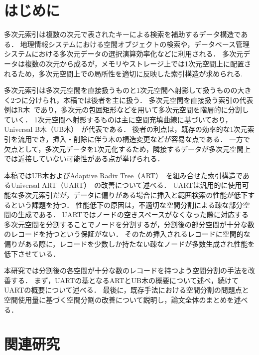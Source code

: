 
\chapter{はじめに}

多次元索引は複数の次元で表されたキーによる検索を補助するデータ構造である．
地理情報システムにおける空間オブジェクトの検索や，データベース管理システムにおける多次元データの選択演算効率化などに利用される．
多次元データは複数の次元から成るが，メモリやストレージ上では1次元空間上に配置されるため，多次元空間上での局所性を適切に反映した索引構造が求められる.

多次元索引は多次元空間を直接扱うものと1次元空間へ射影して扱うものの大きく2つに分けられ，本稿では後者を主に扱う．
多次元空間を直接扱う索引の代表例はR木~\cite{sigmod:Beckmann1990}であり，多次元の包囲矩形などを用いて多次元空間を階層的に分割していく．
1次元空間へ射影するものは主に空間充填曲線に基づいており，Universal B木（UB木）~\cite{wwca:Bayer1997}が代表である．
後者の利点は，既存の効率的な1次元索引を流用でき，挿入・削除に伴う木の構造変更などが容易な点である．
一方で欠点として，多次元データを1次元化するため，隣接するデータが多次元空間上では近接していない可能性がある点が挙げられる．

本稿ではUB木およびAdaptive Radix Tree（ART）~\cite{icde:Leis2013}を組み合せた索引構造であるUniversal ART（UART）~\cite{deim:Suzuki2023}の改善について述べる．
UARTは汎用的に使用可能な多次元索引だが，データに偏りがある場合に挿入と範囲検索の性能が低下するという課題を持つ．
性能低下の原因は，不適切な空間分割による疎な部分空間の生成である．
UARTではノードの空きスペースがなくなった際に対応する多次元空間を分割することでノードを分割するが，分割後の部分空間が十分な数のレコードを持つという保証がない．
そのため挿入されるレコードに空間的な偏りがある際に，レコードを少数しか持たない疎なノードが多数生成され性能を低下させている．

本研究では分割後の各空間が十分な数のレコードを持つよう空間分割の手法を改善する．
まず，UARTの基となるARTとUB木の概要について述べ，続けてUARTの概要について述べる．
最後に，既存手法における空間分割の問題点と空間使用量に基づく空間分割の改善について説明し，論文全体のまとめを述べる．




\chapter{関連研究}

